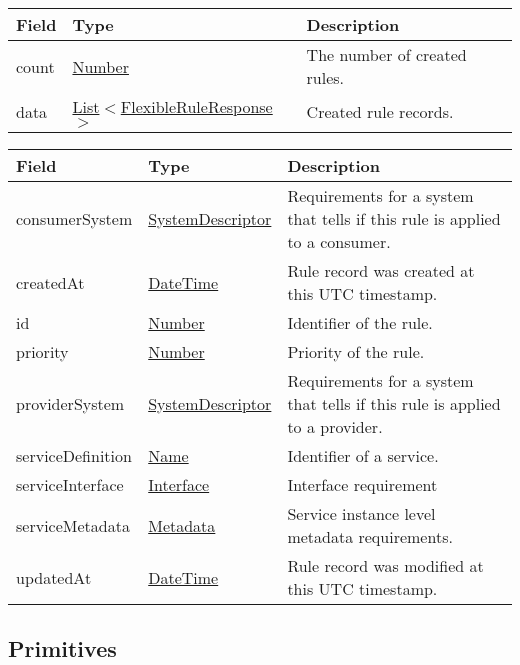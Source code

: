 \documentclass[a4paper]{arrowhead}
\newcommand{\pref}[1]{{\textcolor{ArrowheadGrey}{\hyperref[sec:model:primitives:#1]{#1}}}}
\begin{document}
\label{sec:model:FlexibleRuleListResponse}
 
\begin{table}[ht!]
\begin{tabularx}{\textwidth}{| p{2cm} | p{5.0cm} | X |} \hline
\rowcolor{gray!33} Field & Type      & Description \\ \hline
count & \pref{Number} & The number of created rules. \\ \hline
data & \pref{List}$<$\hyperref[sec:model:FlexibleRuleResponse]{FlexibleRuleResponse}$>$ & Created rule records. \\ \hline
\end{tabularx}
\end{table}

\label{sec:model:FlexibleRuleResponse}

\begin{table}[ht!]
\begin{tabularx}{\textwidth}{| p{4.25cm} | p{3.5cm} | X |} \hline
\rowcolor{gray!33} Field & Type      & Description \\ \hline
consumerSystem & \hyperref[sec:model:SystemDescriptor]{SystemDescriptor} & Requirements for a system that tells if this rule is applied to a consumer. \\ \hline
createdAt & \pref{DateTime} & Rule record was created at this UTC time\-stamp. \\ \hline
id & \pref{Number} & Identifier of the rule. \\ \hline
priority & \pref{Number} & Priority of the rule. \\ \hline
providerSystem & \hyperref[sec:model:SystemDescriptor]{SystemDescriptor} & Requirements for a system that tells if this rule is applied to a provider. \\ \hline
serviceDefinition & \pref{Name} &  Identifier of a service. \\ \hline
serviceInterface & \pref{Interface} & Interface requirement \\ \hline
serviceMetadata & \hyperref[sec:model:Metadata]{Metadata} & Service instance level metadata requirements. \\ \hline
updatedAt & \pref{DateTime} & Rule record was modified at this UTC time\-stamp. \\ \hline
\end{tabularx}
\end{table}

\subsection{Primitives}
\label{sec:model:primitives}
\end{document}
